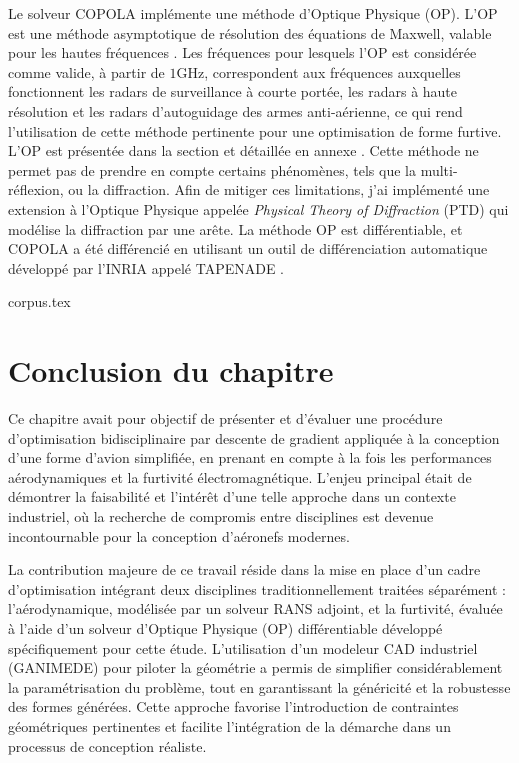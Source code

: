 Le solveur COPOLA implémente une méthode d'Optique Physique (OP). L'OP est une méthode asymptotique de résolution des équations de Maxwell, valable pour les hautes fréquences \citep{Laval2006}. Les fréquences pour lesquels l'OP est considérée comme valide, à partir de $1 \unit{\giga\hertz}$, correspondent aux fréquences auxquelles fonctionnent les radars de surveillance à courte portée, les radars à haute résolution et les radars d'autoguidage des armes anti-aérienne, ce qui rend l'utilisation de cette méthode pertinente pour une optimisation de forme furtive. L'OP est présentée dans la section \textit{} et détaillée en annexe \textit{}. Cette méthode ne permet pas de prendre en compte certains phénomènes, tels que la multi-réflexion, ou la diffraction. Afin de mitiger ces limitations, j'ai implémenté une extension à l'Optique Physique appelée \textit{Physical Theory of Diffraction} (PTD) \citep{Michaeli1986} qui modélise la diffraction par une arête. La méthode OP est différentiable, et COPOLA a été différencié en utilisant un outil de différenciation automatique développé par l'INRIA appelé TAPENADE \citep{Hascoet2013}.

\begin{article}
    {corpus.tex}
\end{article}
    
\section*{Conclusion du chapitre}
\label{sec:ch2-conclgen}

Ce chapitre avait pour objectif de présenter et d'évaluer une procédure d'optimisation bidisciplinaire par descente de gradient appliquée à la conception d'une forme d'avion simplifiée, en prenant en compte à la fois les performances aérodynamiques et la furtivité électromagnétique. L'enjeu principal était de démontrer la faisabilité et l'intérêt d'une telle approche dans un contexte industriel, où la recherche de compromis entre disciplines est devenue incontournable pour la conception d'aéronefs modernes.

La contribution majeure de ce travail réside dans la mise en place d'un cadre d'optimisation intégrant deux disciplines traditionnellement traitées séparément : l'aérodynamique, modélisée par un solveur RANS adjoint, et la furtivité, évaluée à l'aide d'un solveur d'Optique Physique (OP) différentiable développé spécifiquement pour cette étude. L'utilisation d'un modeleur CAD industriel (GANIMEDE) pour piloter la géométrie a permis de simplifier considérablement la paramétrisation du problème, tout en garantissant la généricité et la robustesse des formes générées. Cette approche favorise l'introduction de contraintes géométriques pertinentes et facilite l'intégration de la démarche dans un processus de conception réaliste.

